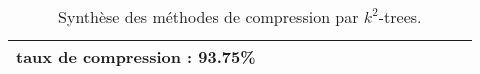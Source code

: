 \begin{landscape}
\begin{table}
\begin{tabular}{|C{3cm}|c|c|c|c|c|c|c|c|c|c|c|c|c|}
\begin{minipage}[t]{0.3\textwidth}
	 taux de compression : 93.75\% 
  \end{minipage}	\\  				
  				\hline 
				
									\end{tabular}
									\caption{Synthèse des méthodes de compression par $k^2$-trees.}									
									
								\end{table}
								
							\end{landscape}				